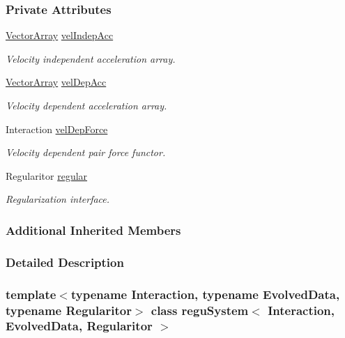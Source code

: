 \subsubsection*{Private Attributes}
\begin{DoxyCompactItemize}
\item 
\mbox{\hyperlink{classregu_system_aa4ecefb5c437230b994171e231450be8}{Vector\+Array}} \mbox{\hyperlink{classregu_system_afafcbf5f0c994cfe62d9fb8fb51023ab}{vel\+Indep\+Acc}}
\begin{DoxyCompactList}\small\item\em Velocity independent acceleration array. \end{DoxyCompactList}\item 
\mbox{\hyperlink{classregu_system_aa4ecefb5c437230b994171e231450be8}{Vector\+Array}} \mbox{\hyperlink{classregu_system_a3ea004b24ff22b8cc2f79f48e96dfad3}{vel\+Dep\+Acc}}
\begin{DoxyCompactList}\small\item\em Velocity dependent acceleration array. \end{DoxyCompactList}\item 
Interaction \mbox{\hyperlink{classregu_system_a9361c6c64c946570d6a71e3ab6ba74a0}{vel\+Dep\+Force}}
\begin{DoxyCompactList}\small\item\em Velocity dependent pair force functor. \end{DoxyCompactList}\item 
Regularitor \mbox{\hyperlink{classregu_system_a0009f79e1dbc7668e2cac4bc90332353}{regular}}
\begin{DoxyCompactList}\small\item\em Regularization interface. \end{DoxyCompactList}\end{DoxyCompactItemize}
\subsubsection*{Additional Inherited Members}


\subsubsection{Detailed Description}
\subsubsection*{template$<$typename Interaction, typename Evolved\+Data, typename Regularitor$>$\newline
class regu\+System$<$ Interaction, Evolved\+Data, Regularitor $>$}

